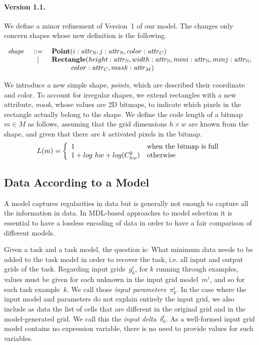\documentclass[a4paper]{llncs}
\newenvironment{datatype}{$\begin{array}{lcl}}{\end{array}$}
\newcommand{\is}{&\ ::=\ &}
\newcommand{\altis}{\\ &\ \mid\ &}
\newcommand{\nat}{\mathbb{N}}
\begin{document}
\paragraph{Version 1.1.} We define a minor refinement of Version~1 of
our model. The changes only concern shapes whose new definition is the
following.

\begin{center}
\begin{datatype}
  {\it shape} \is {\bf Point}(i: {\it attr}_\nat, j: {\it attr}_\nat, color: {\it attr}_C)
  \altis {\bf Rectangle}(height: {\it attr}_\nat, width: {\it attr}_\nat, mini: {\it attr}_\nat, minj: {\it attr}_\nat,\\
  & & \hspace*{1cm} color: {\it attr}_C, mask: {\it attr}_M)
\end{datatype}
\end{center}

We introduce a new simple shape, {\em points}, which are described
their coordinate and color. To account for irregular shapes, we extend
rectangles with a new attribute, {\em mask}, whose values are 2D
bitmaps, to indicate which pixels in the rectangle actually belong to
the shape. We define the code length of a bitmap~$m \in M$ as follows,
assuming that the grid dimensions $h \times w$ are known from the
shape, and given that there are $k$ activated pixels in the bitmap.
\[ L(m) = \left\{
  \begin{array}{l@{\quad}l}
    1 & \textrm{when the bitmap is full} \\
    1 + log\ hw + log(C_{hw}^k) & \textrm{otherwise} \\
  \end{array}\right. \]


\subsection{Data According to a Model}
\label{data}

A model captures regularities in data but is generally not enough to
capture all the information in data. In MDL-based approaches to model
selection it is essential to have a lossless encoding of data in order
to have a fair comparison of different models.

Given a task and a task model, the question is: What minimum data
needs to be added to the task model in order to recover the task,
i.e. all input and output grids of the task.
%
Regarding input grids~$g^i_k$, for $k$ running through examples,
values must be given for each unknown in the input grid model~$m^i$,
and so for each task example~$k$. We call those {\em input
  parameters}~$\pi^i_k$. In the case where the input model and
parameters do not explain entirely the input grid, we also include as
data the list of cells that are different in the original grid and in
the model-generated grid. We call this the {\em input
  delta}~$\delta^i_k$. As a well-formed input grid model contains no
expression variable, there is no need to provide values for such
variables.
\end{document}
